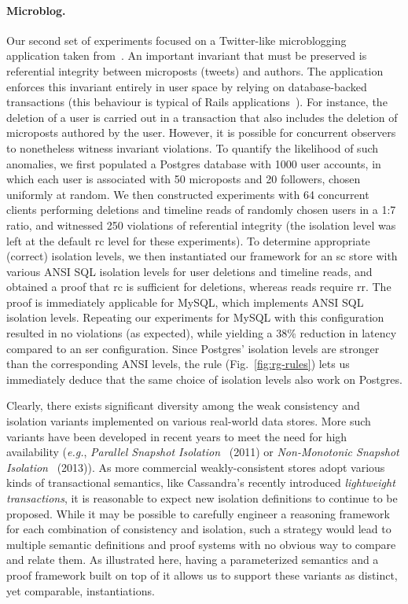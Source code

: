\paragraph{Microblog.} Our second set of experiments focused on a
Twitter-like microblogging application taken from~\cite{railsbook}.
An important invariant that must be preserved is referential integrity
between microposts (tweets) and authors. The application enforces this
invariant entirely in user space by relying on database-backed
transactions (this behaviour is typical of Rails
applications~\cite{bailisferal}).  For instance, the deletion of a
user is carried out in a transaction that also includes the deletion
of microposts authored by the user.  However, it is possible for
concurrent observers to nonetheless witness invariant violations. To
quantify the likelihood of such anomalies, we first populated a
Postgres database with 1000 user accounts, in which each user is
associated with 50 microposts and 20 followers, chosen uniformly at
random. We then constructed experiments with 64 concurrent clients
performing deletions and timeline reads of randomly chosen users in a
1:7 ratio, and witnessed 250 violations of referential integrity (the
isolation level was left at the default {\sc rc} level for these
experiments). To determine appropriate (correct) isolation levels, we
then instantiated our framework for an {\sc sc} store with various
ANSI SQL isolation levels for user deletions and timeline reads, and
obtained a proof that {\sc rc} is sufficient for deletions, whereas
reads require {\sc rr}. The proof is immediately applicable for MySQL,
which implements ANSI SQL isolation levels. Repeating our experiments
for MySQL with this configuration resulted in no violations (as
expected), while yielding a 38\% reduction in latency compared to an
{\sc ser} configuration.  Since Postgres' isolation levels are
stronger than the corresponding ANSI levels, the 
rule (Fig.~\ref{fig:rg-rules}) lets us immediately deduce that the
same choice of isolation levels also work on Postgres.

Clearly, there exists significant diversity among the weak consistency
and isolation variants implemented on various real-world data
stores. More such variants have been developed in recent years to meet
the need for high availability (\emph{e.g.}, \emph{Parallel Snapshot
  Isolation}~\cite{psi} (2011) or \emph{Non-Monotonic Snapshot
  Isolation}~\cite{nmsi} (2013)).  As more commercial
weakly-consistent stores adopt various kinds of transactional
semantics, like Cassandra's recently introduced \emph{lightweight
  transactions}, it is reasonable to expect new isolation definitions
to continue to be proposed.  While it may be possible to carefully
engineer a reasoning framework for each combination of consistency and
isolation, such a strategy would lead to multiple semantic definitions
and proof systems with no obvious way to compare and relate them. As
illustrated here, having a parameterized semantics and a proof
framework built on top of it allows us to support these variants as
distinct, yet comparable, instantiations.

